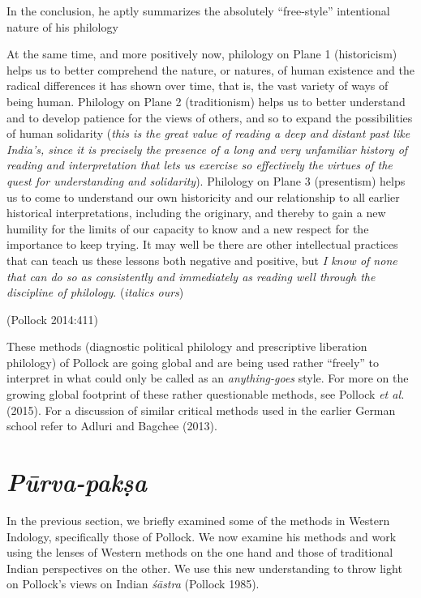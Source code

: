 In the conclusion, he aptly summarizes the absolutely ``free-style'' intentional nature of his philology
\begin{myquote}
At the same time, and more positively now, philology on Plane 1 (historicism) helps us to better comprehend the nature, or natures, of human existence and the radical differences it has shown over time, that is, the vast variety of ways of being human. Philology on Plane 2 (traditionism) helps us to better understand and to develop patience for the views of others, and so to expand the possibilities of human solidarity ({\sl this is the great value of reading a deep and distant past like India's, since it is precisely the presence of a long and very unfamiliar history of reading and interpretation that lets us exercise so effectively the virtues of the quest for understanding and solidarity}). Philology on Plane 3 (presentism) helps us to come to understand our own historicity and our relationship to all earlier historical interpretations, including the originary, and thereby to gain a new humility for the limits of our capacity to know and a new respect for the importance to keep trying. It may well be there are other intellectual practices that can teach us these lessons both negative and positive, but {\sl I know of none that can do so as consistently and immediately as reading well through the discipline of philology}. ({\sl italics ours})

\hfill (Pollock 2014:411) 
\end{myquote}

These methods (diagnostic political philology and prescriptive liberation philology) of Pollock are going global and are being used rather ``freely'' to interpret in what could only be called as an {\sl anything-goes} style. For more on the growing global footprint of these rather questionable methods, see Pollock {\sl et al.} (2015). For a discussion of similar critical methods used in the earlier German school refer to Adluri and Bagchee (2013).

\section*{{\sl\bfseries Pūrva-pakṣa}}

In the previous section, we briefly examined some of the methods in Western Indology, specifically those of Pollock.  We now examine his methods and work using the lenses of Western methods on the one hand and those of traditional Indian perspectives on the other. We use this new understanding to throw light on Pollock's views on Indian {\sl śāstra} (Pollock 1985).

